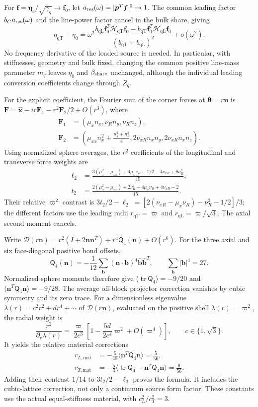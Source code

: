 \documentclass[10pt,aps,onecolumn,notitlepage,nofootinbib]{revtex4-2}
\newcommand{\veta}{\bm\eta}
\newcommand{\qT}{\mathrm{qT}}
\newcommand{\qL}{\mathrm{qL}}
\begin{document}
For $\bm f=\veta_c/\sqrt{\gamma_q}\to\bm f_0$, let
$a_{\rm res}(\omega)=|\bm p^T\bm f|^2\to1$. The common leading factor
$b_Ca_{\rm res}(\omega)$ and the line-power factor cancel in the bulk share,
giving
\[
 \eta_{\qT}-\eta_0
 =\omega^2\frac{b_{\qL}\bm f_0^T\mathcal H_{\qT}\bm f_0
                  -b_{\qT}\bm f_0^T\mathcal H_{\qL}\bm f_0}
 {(b_{\qT}+b_{\qL})^2}+o(\omega^2).
\]
No frequency derivative of the loaded source is needed. In particular,
with stiffnesses, geometry and bulk fixed, changing the common positive
line-mass parameter $m_q$ leaves $\eta_0$ and $\beta_{\rm share}$
unchanged, although the individual leading conversion coefficients
change through $Z_q$.

For the explicit coefficient, the Fourier sum of the corner forces at
$\bm\theta=r\bm n$ is
$\bm F=\hat{\bm x}-ir\bm F_1-r^2\bm F_2/2+O(r^3)$, where
\[
 \begin{aligned}
 \bm F_1&=(\mu_xn_x,\nu_Rn_y,\nu_Rn_z),\\
 \bm F_2&=\left(\mu_{xx}n_x^2+\frac{n_y^2+n_z^2}{4},
               2\nu_{xR}n_xn_y,2\nu_{xR}n_xn_z\right).
 \end{aligned}
\]
Using normalized sphere averages, the $r^2$ coefficients of the
longitudinal and transverse force weights are
\[
 \begin{aligned}
 \ell_2&=\frac{3(\mu_x^2-\mu_{xx})+4\mu_x\nu_R-1/2-4\nu_{xR}+8\nu_R^2}{15},\\
 t_2&=\frac{2(\mu_x^2-\mu_{xx})+2\nu_R^2-4\mu_x\nu_R+4\nu_{xR}-2}{15}.
 \end{aligned}
\]
Their relative $\varpi^2$ contrast is $3t_2/2-\ell_2$
$=[2(\nu_{xR}-\mu_x\nu_R)-\nu_R^2-1/2]/3$; the different factors
use the leading radii $r_{\qT}=\varpi$ and
$r_{\qL}=\varpi/\sqrt3$. The axial second moment cancels.

Write
$\mathcal D(r\bm n)=r^2(I+2\bm n\bm n^T)+r^4\mathsf Q_4(\bm n)+O(r^6)$.
For the three axial and six face-diagonal positive bond offsets,
\[
 \mathsf Q_4(\bm n)=-\frac1{12}\sum_{\bm b}(\bm n\cdot\bm b)^4
 \hat{\bm b}\hat{\bm b}^T,\qquad \sum_{\bm b}|\bm b|^4=27.
\]
Normalized sphere moments therefore give
$\langle\operatorname{tr}\mathsf Q_4\rangle=-9/20$ and
$\langle\bm n^T\mathsf Q_4\bm n\rangle=-9/28$.
The average off-block projector correction vanishes by cubic symmetry
and its zero trace. For a dimensionless eigenvalue
$\lambda(r)=c^2r^2+dr^4+\cdots$ of $\mathcal D(r\bm n)$, evaluated on the positive shell $\lambda(r)=\varpi^2$, the radial weight is
\[
 \frac{r^2}{\partial_r\lambda(r)}
 =\frac{\varpi}{2c^3}
 \left[1-\frac{5d}{2c^4}\varpi^2+O(\varpi^4)\right],
 \qquad c\in\{1,\sqrt3\}.
\]
It yields the relative material corrections
\[
 \begin{aligned}
 r_{L,\mathrm{mat}}&=-\frac5{18}
 \langle\bm n^T\mathsf Q_4\bm n\rangle=\frac5{56},\\
 r_{T,\mathrm{mat}}&=-\frac54
 \langle\operatorname{tr}\mathsf Q_4-\bm n^T\mathsf Q_4\bm n\rangle
 =\frac9{56}.
 \end{aligned}
\]
Adding their contrast $1/14$ to $3t_2/2-\ell_2$ proves the formula.
It includes the cubic-lattice correction, not only a continuum source
form factor. These constants use the actual equal-stiffness material,
with $c_L^2/c_T^2=3$.
\end{document}
